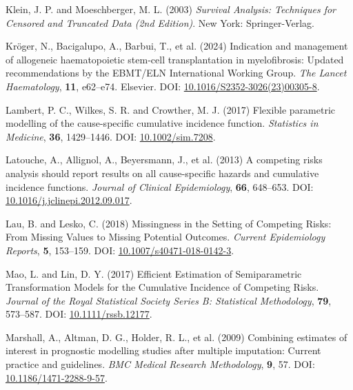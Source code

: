 \documentclass[
  letterpaper,
  DIV=11,
  numbers=noendperiod]{scrreprt}
\newlength{\cslhangindent}
\newlength{\cslentryspacingunit} %
\newenvironment{CSLReferences}[2] %
 {%
  \setlength{\parindent}{0pt}
  \ifodd #1
  \let\oldpar\par
  \def\par{\hangindent=\cslhangindent\oldpar}
  \fi
  \setlength{\parskip}{#2\cslentryspacingunit}
 }%
 {}
\begin{document}
\begin{CSLReferences}{1}{0}
\leavevmode{}%
Klein, J. P. and Moeschberger, M. L. (2003) \emph{Survival Analysis:
{Techniques} for Censored and Truncated Data (2nd Edition)}. New York:
Springer-Verlag.

\leavevmode{}%
Kröger, N., Bacigalupo, A., Barbui, T., et al. (2024) Indication and
management of allogeneic haematopoietic stem-cell transplantation in
myelofibrosis: Updated recommendations by the {EBMT}/{ELN International
Working Group}. \emph{The Lancet Haematology}, \textbf{11}, e62--e74.
Elsevier. DOI:
\href{https://doi.org/10.1016/S2352-3026(23)00305-8}{10.1016/S2352-3026(23)00305-8}.

\leavevmode{}%
Lambert, P. C., Wilkes, S. R. and Crowther, M. J. (2017) Flexible
parametric modelling of the cause-specific cumulative incidence
function. \emph{Statistics in Medicine}, \textbf{36}, 1429--1446. DOI:
\href{https://doi.org/10.1002/sim.7208}{10.1002/sim.7208}.

\leavevmode{}%
Latouche, A., Allignol, A., Beyersmann, J., et al. (2013) A competing
risks analysis should report results on all cause-specific hazards and
cumulative incidence functions. \emph{Journal of Clinical Epidemiology},
\textbf{66}, 648--653. DOI:
\href{https://doi.org/10.1016/j.jclinepi.2012.09.017}{10.1016/j.jclinepi.2012.09.017}.

\leavevmode{}%
Lau, B. and Lesko, C. (2018) Missingness in the {Setting} of {Competing
Risks}: From {Missing Values} to {Missing Potential Outcomes}.
\emph{Current Epidemiology Reports}, \textbf{5}, 153--159. DOI:
\href{https://doi.org/10.1007/s40471-018-0142-3}{10.1007/s40471-018-0142-3}.

\leavevmode{}%
Mao, L. and Lin, D. Y. (2017) Efficient {Estimation} of {Semiparametric
Transformation Models} for the {Cumulative Incidence} of {Competing
Risks}. \emph{Journal of the Royal Statistical Society Series B:
Statistical Methodology}, \textbf{79}, 573--587. DOI:
\href{https://doi.org/10.1111/rssb.12177}{10.1111/rssb.12177}.

\leavevmode{}%
Marshall, A., Altman, D. G., Holder, R. L., et al. (2009) Combining
estimates of interest in prognostic modelling studies after multiple
imputation: Current practice and guidelines. \emph{BMC Medical Research
Methodology}, \textbf{9}, 57. DOI:
\href{https://doi.org/10.1186/1471-2288-9-57}{10.1186/1471-2288-9-57}.


\end{CSLReferences}
\end{document}
